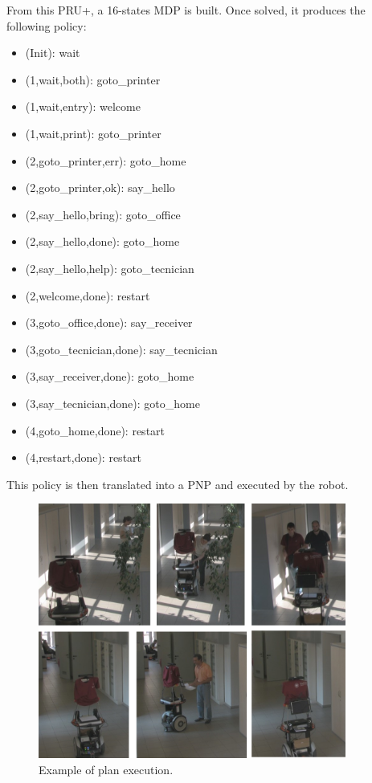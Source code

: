 From this PRU+, a 16-states MDP is built. %
Once solved, it produces the following policy:
\begin{multicols}{2}
  \begin{small}
    \begin{itemize}
    \item (Init): wait
    \item (1,wait,both): goto\_printer
    \item (1,wait,entry): welcome
    \item (1,wait,print): goto\_printer
    \item (2,goto\_printer,err): goto\_home
    \item (2,goto\_printer,ok): say\_hello
    \item (2,say\_hello,bring): goto\_office
    \item (2,say\_hello,done): goto\_home
    \item (2,say\_hello,help): goto\_tecnician
    \item (2,welcome,done): restart
    \item (3,goto\_office,done): say\_receiver
    \item (3,goto\_tecnician,done): say\_tecnician
    \item (3,say\_receiver,done): goto\_home
    \item (3,say\_tecnician,done): goto\_home
    \item (4,goto\_home,done): restart
    \item (4,restart,done): restart
    \end{itemize}
  \end{small}
\end{multicols}

This policy is then translated into a PNP and executed by the robot.

\begin{figure}
\centering
\includegraphics[width=0.9\textwidth]{fig/DIAGprinter-demo}
\caption{Example of plan execution.}
\label{fig:DIAGtest}
\end{figure}


